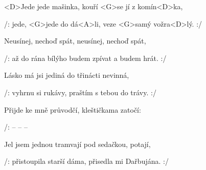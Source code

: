 

\zr
<D>Jede jede mašinka, kouří <G>se jí z komín<D>ka,

/: jede, <G>jede do dá<A>li, veze <G>samý vožra<D>lý. :/
\kr

\zs
Neusínej, nechoď spát, neusínej, nechoď spát,

/: až do rána bílýho budem zpívat a budem hrát. :/
\ks

\zs
Lásko má jsi jediná do třinácti nevinná,

/: vyhrnu si rukávy, praštím s tebou do trávy. :/
\ks

\zr \kr

\zs
Přijde ke mně průvodčí, kleštičkama zatočí:

/:  --  --  -- 
\rlap{ :/}
\ks

\zr \kr

\zs
Jel jsem jednou tramvají pod sedačkou, potají,

/: přistoupila starší dáma, přisedla mi Dařbujána. :/
\ks

\zr \kr

\kp
